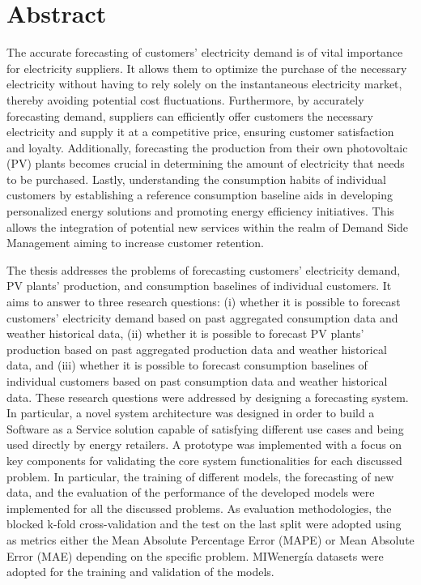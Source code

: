 \chapter*{Abstract} %
\label{abtract}

\vspace{0.4 cm}

The accurate forecasting of customers' electricity demand is of vital importance for electricity suppliers.
It allows them to optimize the purchase of the necessary electricity without having to rely solely on the instantaneous electricity market, thereby avoiding potential cost fluctuations.
Furthermore, by accurately forecasting demand, suppliers can efficiently offer customers the necessary electricity and supply it at a competitive price, ensuring customer satisfaction and loyalty.
Additionally, forecasting the production from their own photovoltaic (PV) plants becomes crucial in determining the amount of electricity that needs to be purchased.
Lastly, understanding the consumption habits of individual customers by establishing a reference consumption baseline aids in developing personalized energy solutions and promoting energy efficiency initiatives.
This allows the integration of potential new services within the realm of Demand Side Management aiming to increase customer retention.

The thesis addresses the problems of forecasting customers' electricity demand, PV plants' production, and consumption baselines of individual customers.
It aims to answer to three research questions:
(i) whether it is possible to forecast customers' electricity demand based on past aggregated consumption data and weather historical data,
(ii) whether it is possible to forecast PV plants' production based on past aggregated production data and weather historical data,
and (iii) whether it is possible to forecast consumption baselines of individual customers based on past consumption data and weather historical data.
These research questions were addressed by designing a forecasting system.
In particular, a novel system architecture was designed in order to build a Software as a Service solution capable of satisfying different use cases and being used directly by energy retailers.
A prototype was implemented with a focus on key components for validating the core system functionalities for each discussed problem.
In particular, the training of different models, the forecasting of new data, and the evaluation of the performance of the developed models were implemented for all the discussed problems.
As evaluation methodologies, the blocked k-fold cross-validation and the test on the last split were adopted using as metrics either the Mean Absolute Percentage Error (MAPE) or Mean Absolute Error (MAE) depending on the specific problem.
MIWenergía datasets were adopted for the training and validation of the models.

